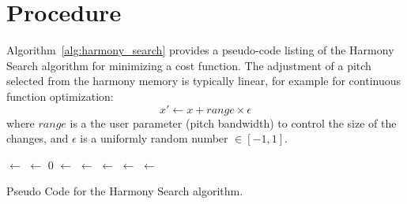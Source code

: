 \documentclass[a4paper, 11pt]{article}
\begin{document}
\section{Procedure}
\label{sec:procedure}
Algorithm~\ref{alg:harmony_search} provides a pseudo-code listing of the Harmony Search algorithm for minimizing a cost function. 
The adjustment of a pitch selected from the harmony memory is typically linear, for example for continuous function optimization: 
\begin{equation}
	x\prime \leftarrow x + range \times \epsilon
\end{equation}
where $range$ is a the user parameter (pitch bandwidth) to control the size of the changes, and $\epsilon$ is a uniformly random number $\in [-1,1]$.

\begin{algorithm}[ht]
	\SetLine

	
	\KwIn{\NumPitches, \PitchBounds, \MemorySize, \ConsolidationRate, \AdjustRate, \MaxImprovisations}		
	\KwOut{\Best}

	\Harmonies $\leftarrow$ \InitializeHarmonyMemory{\NumPitches, \PitchBounds, \MemorySize}\;
	\EvaluateHarmonies{\Harmonies}\;
	 {
		\CandidateHarmony $\leftarrow$ $0$\;		
		\ForEach{\Pitch $\in$ \NumPitches} {			
			\eIf{\Rand{} $\leq$ \ConsolidationRate} {
				\RandomHarmonyPitch $\leftarrow$ \SelectRandomHarmonyPitch{\Harmonies, \Pitch}\;
				\eIf{\Rand{} $\leq$ \AdjustRate} {
					\CandidateHarmonyPitch $\leftarrow$ \AdjustPitch{\RandomHarmonyPitch}\;
				} {
					\CandidateHarmonyPitch $\leftarrow$ \RandomHarmonyPitch\;
				}
			} {
				\CandidateHarmonyPitch $\leftarrow$ \RandomPitch{\PitchBounds}\;
			}		
		}
		\EvaluateHarmonies{\CandidateHarmony}\;
		\If{\Cost{\CandidateHarmony} $\leq$ \Cost{\Worst{\Harmonies}}} {
			\Worst{\Harmonies} $\leftarrow$ \CandidateHarmony\;
		}
	}
	\Return{\Best}\;
	\caption{Pseudo Code for the Harmony Search algorithm.}
	\label{alg:harmony_search}
\end{algorithm}
\end{document}
